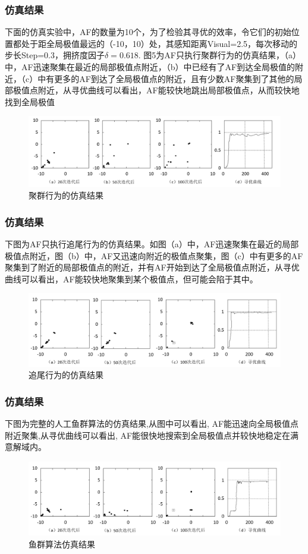 \begin{frame}
\frametitle{仿真结果}
	下面的仿真实验中，AF的数量为10个，为了检验其寻优的效率，令它们的初始位置都处于距全局极值最远的（-10，10）处，其感知距离Visual=2.5，每次移动的步长Step=0.3，拥挤度因子$\delta = 0.618$.
图5为AF只执行聚群行为的仿真结果，（a）中，AF迅速聚集在最近的局部极值点附近，（b）中已经有了AF到达全局极值的附近，（c）中有更多的AF到达了全局极值点的附近，且有少数AF聚集到了其他的局部极值点附近，从寻优曲线可以看出，AF能较快地跳出局部极值点，从而较快地找到全局极值
\begin{figure}[htbp]
\includegraphics[width=1.0\textwidth]{pic/fish11.png}
\caption{聚群行为的仿真结果}
\end{figure}
\end{frame}
\begin{frame}
\frametitle{仿真结果}
下图为AF只执行追尾行为的仿真结果。如图（a）中，AF迅速聚集在最近的局部极值点附近，图（b）中，AF又迅速向附近的极值点聚集，图（c）中有更多的AF聚集到了附近的局部极值点的附近，并有AF开始到达了全局极值点附近，从寻优曲线可以看出，AF能较快地聚集到某个极值点，但可能会陷于其中。
\begin{figure}[H]
\includegraphics[width=1.0\textwidth]{pic/fish12.png}
\caption{追尾行为的仿真结果}
\end{figure}
\end{frame}
\begin{frame}
\frametitle{仿真结果}
下图为完整的人工鱼群算法的仿真结果,从图中可以看出, AF能迅速向全局极值点附近聚集,从寻优曲线可以看出, AF能很快地搜索到全局极值点并较快地稳定在满意解域内。
\begin{figure}[H]
\includegraphics[width=1.0\textwidth]{pic/fish13.png}
\caption{鱼群算法仿真结果}
\end{figure}
\end{frame}

